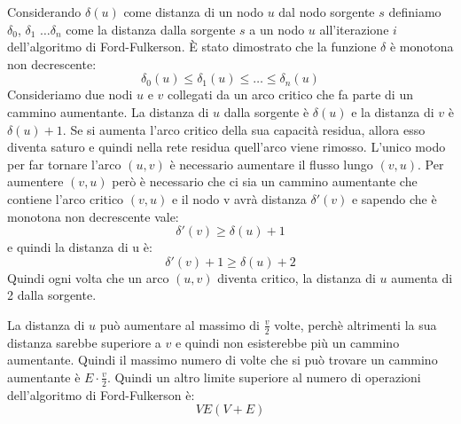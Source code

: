 \documentclass[a4paper]{article}
\begin{document}
\vspace{1em}
\noindent
Considerando \( \delta(u) \) come distanza di un nodo \( u \) dal nodo sorgente \( s \)
definiamo \( \delta_0 \), \( \delta_1 \) \( \ldots \delta_n \) come la distanza
dalla sorgente \( s \) a un nodo \( u \) all'iterazione \( i \) dell'algoritmo di
Ford-Fulkerson. È stato dimostrato che la funzione \( \delta \) è monotona non decrescente:
\[
  \delta_0(u) \le \delta_1(u) \le \ldots \le \delta_n(u)
\] 
Consideriamo due nodi \( u \) e \( v \) collegati da un arco critico che fa parte di un
cammino aumentante. La distanza di \( u \) dalla sorgente è \( \delta(u) \) e la 
distanza di \( v \) è \( \delta(u) + 1 \). Se si aumenta l'arco critico della sua
capacità residua, allora esso diventa saturo e quindi nella rete residua quell'arco
viene rimosso. L'unico modo per far tornare l'arco \( (u,v) \) è necessario aumentare
il flusso lungo \( (v,u) \). Per aumentere \( (v,u) \) però è necessario che ci
sia un cammino aumentante che contiene l'arco critico \( (v,u) \) e il nodo v
avrà distanza \( \delta'(v) \) e sapendo che è monotona non decrescente vale:
\[
  \delta'(v) \ge  \delta(u) + 1
\] 
e quindi la distanza di u è:
\[
  \delta'(v) + 1 \ge \delta(u) + 2
\] 
Quindi ogni volta che un arco \( (u,v) \) diventa critico, la distanza di \( u \)
aumenta di 2 dalla sorgente.
\begin{figure}[H]
  \centering
\end{figure}
\noindent
La distanza di \( u \) può aumentare al massimo di \( \frac{v}{2} \) volte, perchè
altrimenti la sua distanza sarebbe superiore a \( v \) e quindi non esisterebbe più un
cammino aumentante. Quindi il massimo numero di volte che si può trovare un cammino
aumentante è \( E \cdot \frac{v}{2} \). Quindi un altro limite superiore al numero
di operazioni dell'algoritmo di Ford-Fulkerson è:
\[
  VE(V+E)
\] 
\end{document}
